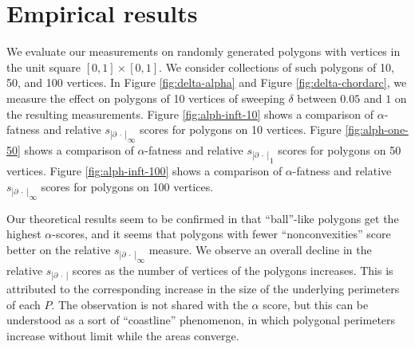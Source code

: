\documentclass[]{jocg}
\newcommand{\abs}[1]{|#1|}
\newcommand{\chordarc}{{s_{\abs{\partial~\cdot~}}}}
\theoremstyle{definition}
\theoremstyle{remark}
\begin{document}
\section{Empirical results}

We evaluate our measurements on randomly generated polygons with vertices in the
unit square $[0,1] \times [0,1]$. We consider collections of such polygons of
10, 50, and 100 vertices. In Figure \ref{fig:delta-alpha} and Figure
\ref{fig:delta-chordarc}, we measure the effect on
polygons of 10 vertices of sweeping $\delta$ between $0.05$ and $1$ on the
resulting measurements. Figure \ref{fig:alph-inft-10} shows a comparison of
$\alpha$-fatness and relative ${\chordarc}_{\infty}$ scores for polygons on 10
vertices.  Figure \ref{fig:alph-one-50} shows a comparison of $\alpha$-fatness
and relative ${\chordarc}_1$ scores for polygons on 50 vertices. Figure
\ref{fig:alph-inft-100} shows a comparison of $\alpha$-fatness and relative
${\chordarc}_{\infty}$ scores for polygons on 100 vertices.

Our theoretical results seem to be confirmed in that ``ball''-like polygons get
the highest $\alpha$-scores, and it seems that polygons with fewer
``nonconvexities'' score better on the relative ${\chordarc}_{\infty}$ measure. We
observe an overall decline in the relative $\chordarc$ scores as the number of
vertices of the polygons increases. This is attributed to the corresponding
increase in the size of the underlying perimeters of each $P$. The observation
is not shared with the $\alpha$ score, but this can be understood as a sort of
``coastline'' phenomenon, in which polygonal perimeters increase without limit
while the areas converge.
\end{document}
